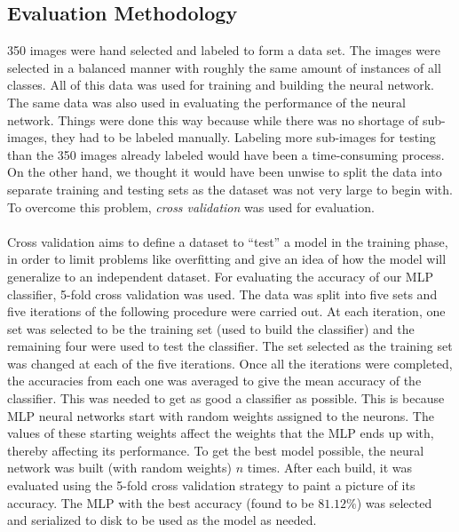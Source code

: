 \subsection{Evaluation Methodology}
350 images were hand selected and labeled to form a data set. The images were selected in a balanced manner with roughly the same amount of instances of all classes. All of this data was used for training and building the neural network. The same data was also used in evaluating the performance of the neural network. Things were done this way because while there was no shortage of sub-images, they had to be labeled manually. Labeling more sub-images for testing than the 350 images already labeled would have been a time-consuming process. On the other hand, we thought it would have been unwise to split the data into separate training and testing sets as the dataset was not very large to begin with. To overcome this problem, \textit{cross validation} was used for evaluation.\\ \\
%
Cross validation aims to define a dataset to ``test'' a model in the training phase, in order to limit problems like overfitting and give an idea of how the model will generalize to an independent dataset. For evaluating the accuracy of our MLP classifier, 5-fold cross validation was used. The data was split into five sets and five iterations of the following procedure were carried out. At each iteration, one set was selected to be the training set (used to build the classifier) and the remaining four were used to test the classifier. The set selected as the training set was changed at each of the five iterations. Once all the iterations were completed, the accuracies from each one was averaged to give the mean accuracy of the classifier. This was needed to get as good a classifier as possible. This is because MLP neural networks start with random weights assigned to the neurons. The values of these starting weights affect the weights that the MLP ends up with, thereby affecting its performance. To get the best model possible, the neural network was built (with random weights) $n$ times. After each build, it was evaluated using the 5-fold cross validation strategy to paint a picture of its accuracy. The MLP with the best accuracy (found to be $81.12\%$) was selected and serialized to disk to be used as the model as needed.


\bigskip

\goodbreak

